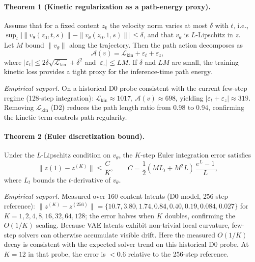 \documentclass[letterpaper]{article}
\begin{document}
\paragraph{Theorem 1 (Kinetic regularization as a path-energy proxy).}
Assume that for a fixed content $z_0$ the velocity norm varies
at most $\delta$ with $t$, i.e.,
$\sup_t\bigl|\|v_\theta(z_0,t,s)\|-\|v_\theta(z_0,1,s)\|\bigr|\leq\delta$,
and that $v_\theta$ is $L$-Lipschitz in $z$.
Let $M$ bound $\|v_\theta\|$ along the trajectory.
Then the path action decomposes as
\begin{equation}
\mathcal{A}(v) = \mathcal{L}_{\mathrm{kin}}
+ \varepsilon_t + \varepsilon_z,
\label{eq:action_decomp}
\end{equation}
where $|\varepsilon_t|\leq 2\delta\sqrt{\mathcal{L}_{\mathrm{kin}}}+\delta^2$
and $|\varepsilon_z|\leq L M$.
If $\delta$ and $L M$ are small, the training kinetic loss
provides a tight proxy for the inference-time path energy.

\emph{Empirical support.}
On a historical D0 probe consistent with the current few-step regime (128-step integration):
$\mathcal{L}_{\mathrm{kin}}\approx 1017$, $\mathcal{A}(v)\approx 698$,
yielding $|\varepsilon_t+\varepsilon_z|\approx 319$.
Removing $\mathcal{L}_{\mathrm{kin}}$ (D2) reduces the path length
ratio from 0.98 to 0.94, confirming the kinetic term controls
path regularity.

\paragraph{Theorem 2 (Euler discretization bound).}
Under the $L$-Lipschitz condition on $v_\theta$,
the $K$-step Euler integration error satisfies
\begin{equation}
\|z(1)-z^{(K)}\|\leq \frac{C}{K},\qquad
C=\frac{1}{2}(M L_t+M^2 L)\,\frac{e^L-1}{L},
\label{eq:euler_bound}
\end{equation}
where $L_t$ bounds the $t$-derivative of $v_\theta$.

\emph{Empirical support.}
Measured over 160 content latents (D0 model, 256-step reference):
$\|z^{(K)} - z^{(256)}\| = \{10.7, 3.80, 1.74, 0.84, 0.40, 0.19, 0.084, 0.027\}$
for $K=1,2,4,8,16,32,64,128$; the error halves when $K$ doubles,
confirming the $O(1/K)$ scaling.
Because VAE latents exhibit non-trivial local curvature, few-step solvers can otherwise accumulate visible drift. Here the measured $O(1/K)$ decay is consistent with the expected solver trend on this historical D0 probe. At $K=12$ in that probe, the error is $<0.6$ relative to the 256-step reference.
\end{document}
